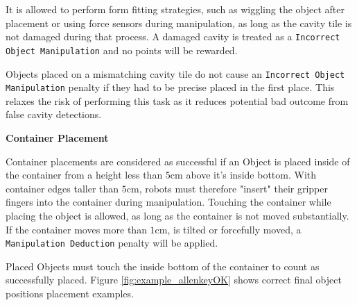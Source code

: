 It is allowed to perform form fitting strategies, such as wiggling the object after placement or using force sensors during manipulation,
as long as the cavity tile is not damaged during that process. A damaged cavity is treated as a \texttt{Incorrect Object Manipulation} and no points will be rewarded.

Objects placed on a mismatching cavity tile do not cause an \texttt{Incorrect Object Manipulation} penalty if they had to be precise placed in the first place. This relaxes the risk of performing this task as it reduces potential bad outcome from false cavity detections.
 

\textbf{Container Placement}

Container placements are considered as successful if an Object is placed inside of the container from a height less than $5\si{\centi\meter}$ above it's inside bottom. With container edges taller than $5\si{\centi\meter}$, robots must therefore "insert" their gripper fingers into the container during manipulation. Touching the container while placing the object is allowed, as long as the container is not moved substantially.
If the container moves more than $1\si{\centi\meter}$, is tilted or forcefully moved, a \texttt{Manipulation Deduction} penalty will be applied.

Placed Objects must touch the inside bottom of the container to count as successfully placed.
Figure \ref{fig:example_allenkeyOK} shows correct final object positions placement examples. 

